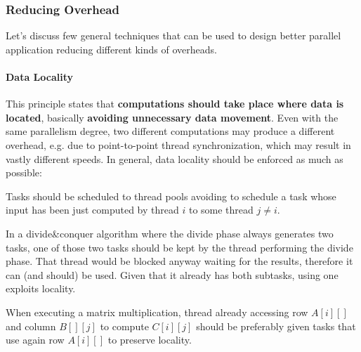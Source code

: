 \documentclass[10pt]{report}
\begin{document}
\subsubsection{Reducing Overhead}
Let's discuss few general techniques that can be used to design better parallel application reducing different kinds of overheads.
\paragraph{Data Locality} This principle states that \textbf{computations should take place where data is located}, basically \textbf{avoiding unnecessary data movement}. Even with the same parallelism degree, two different computations may produce a different overhead, e.g. due to point-to-point thread synchronization, which may result in vastly different speeds. In general, data locality should be enforced as much as possible:
\begin{list}{}{}
	\item Tasks should be scheduled to thread pools avoiding to schedule a task whose input has been just computed by thread $i$ to some thread $j\neq i$.
	\item In a divide\&conquer algorithm where the divide phase always generates two tasks, one of those two tasks should be kept by the thread performing the divide phase. That thread would be blocked anyway waiting for the results, therefore it can (and should) be used. Given that it already has both subtasks, using one exploits locality.
	\item When executing a matrix multiplication, thread already accessing row $A[i][]$ and column $B[][j]$ to compute $C[i][j]$ should be preferably given tasks that use again row $A[i][]$ to preserve locality.
\end{list}
\end{document}
